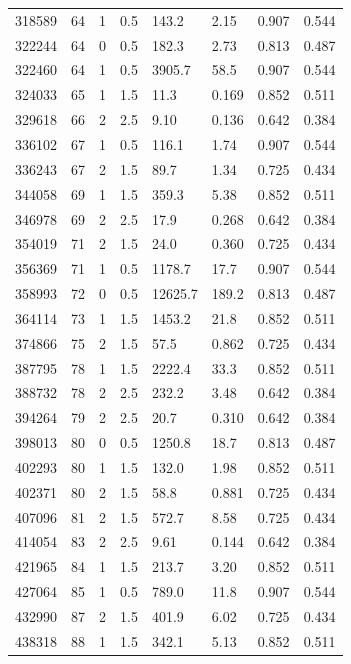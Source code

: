 \documentclass[preview]{standalone}
\begin{document}
{{{\begin{tabular}{L{1.2cm}C{1.2cm} C{0.3cm}C{0.5cm} C{1.4cm}C{1.4cm} C{1.4cm}C{1.4cm}}
  318589  &    64  & 1     & 0.5 &  143.2  & 2.15  & 0.907 &  0.544   \\ 
  322244  &    64  & 0     & 0.5 &  182.3  & 2.73  & 0.813 &  0.487   \\ 
  322460  &    64  & 1     & 0.5 &  3905.7  & 58.5  & 0.907 &  0.544   \\ 
  324033  &    65  & 1     & 1.5 &  11.3  & 0.169  & 0.852 &  0.511   \\ 
  329618  &    66  & 2     & 2.5 &  9.10  & 0.136  & 0.642 &  0.384   \\ 
  336102  &    67  & 1     & 0.5 &  116.1  & 1.74  & 0.907 &  0.544   \\ 
  336243  &    67  & 2     & 1.5 &  89.7  & 1.34  & 0.725 &  0.434   \\ 
  344058  &    69  & 1     & 1.5 &  359.3  & 5.38  & 0.852 &  0.511   \\ 
  346978  &    69  & 2     & 2.5 &  17.9  & 0.268  & 0.642 &  0.384   \\ 
  354019  &    71  & 2     & 1.5 &  24.0  & 0.360  & 0.725 &  0.434   \\ 
  356369  &    71  & 1     & 0.5 &  1178.7  & 17.7  & 0.907 &  0.544   \\ 
  358993  &    72  & 0     & 0.5 &  12625.7  & 189.2  & 0.813 &  0.487   \\ 
  364114  &    73  & 1     & 1.5 &  1453.2  & 21.8  & 0.852 &  0.511   \\ 
  374866  &    75  & 2     & 1.5 &  57.5  & 0.862  & 0.725 &  0.434   \\ 
  387795  &    78  & 1     & 1.5 &  2222.4  & 33.3  & 0.852 &  0.511   \\ 
  388732  &    78  & 2     & 2.5 &  232.2  & 3.48  & 0.642 &  0.384   \\ 
  394264  &    79  & 2     & 2.5 &  20.7  & 0.310  & 0.642 &  0.384   \\ 
  398013  &    80  & 0     & 0.5 &  1250.8  & 18.7  & 0.813 &  0.487   \\ 
  402293  &    80  & 1     & 1.5 &  132.0  & 1.98  & 0.852 &  0.511   \\ 
  402371  &    80  & 2     & 1.5 &  58.8  & 0.881  & 0.725 &  0.434   \\ 
  407096  &    81  & 2     & 1.5 &  572.7  & 8.58  & 0.725 &  0.434   \\ 
  414054  &    83  & 2     & 2.5 &  9.61  & 0.144  & 0.642 &  0.384   \\ 
  421965  &    84  & 1     & 1.5 &  213.7  & 3.20  & 0.852 &  0.511   \\ 
  427064  &    85  & 1     & 0.5 &  789.0  & 11.8  & 0.907 &  0.544   \\ 
  432990  &    87  & 2     & 1.5 &  401.9  & 6.02  & 0.725 &  0.434   \\ 
  438318  &    88  & 1     & 1.5 &  342.1  & 5.13  & 0.852 &  0.511   \\ 
\hline 
\end{tabular} 

}}}
\end{document}
